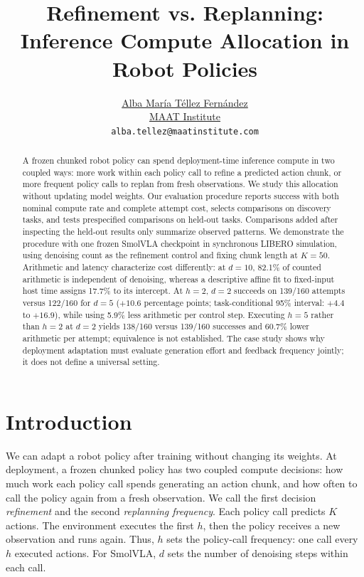 \documentclass{article}
\title{Refinement vs. Replanning: Inference Compute Allocation in Robot Policies}
\author{\href{https://amtellezfernandez.com/}{Alba Mar\'ia T\'ellez Fern\'andez}\\
\href{https://maatinstitute.com/}{MAAT Institute}\\
\texttt{alba.tellez@maatinstitute.com}}
\begin{document}
\maketitle

\begin{abstract}
A frozen chunked robot policy can spend deployment-time inference compute in two coupled ways:
more work within each policy call to refine a predicted action chunk, or more
frequent policy calls to replan from fresh observations. We study this allocation
without updating model weights. Our evaluation procedure reports success with
both nominal compute rate and complete attempt cost, selects comparisons on
discovery tasks, and tests prespecified comparisons on held-out tasks. Comparisons
added after inspecting the held-out results only summarize observed patterns. We
demonstrate the procedure
with one frozen SmolVLA checkpoint in synchronous LIBERO simulation, using
denoising count as the refinement control and fixing chunk length at $K=50$.
Arithmetic and latency characterize cost differently: at $d=10$, 82.1\% of
counted arithmetic is independent of denoising, whereas a descriptive affine
fit to fixed-input host time assigns 17.7\% to its intercept. At $h=2$, $d=2$
succeeds on 139/160 attempts versus 122/160 for $d=5$ ($+10.6$ percentage
points; task-conditional 95\% interval: $+4.4$ to $+16.9$), while using 5.9\%
less arithmetic per control step. Executing $h=5$ rather than $h=2$ at $d=2$
yields 138/160 versus 139/160 successes and 60.7\% lower arithmetic per attempt;
equivalence is not established. The case study shows why deployment adaptation
must evaluate generation effort and feedback frequency jointly; it does not
define a universal setting.
\end{abstract}

\section{Introduction}

We can adapt a robot policy after training without changing its weights. At
deployment, a frozen chunked policy has two coupled compute decisions: how much
work each policy call spends generating an action chunk, and how often to call
the policy again from a fresh observation. We call the first decision
\emph{refinement} and the second \emph{replanning frequency}. Each policy call
predicts $K$ actions. The environment executes the first $h$, then the policy
receives a new observation and runs again. Thus, $h$ sets the policy-call
frequency: one call every $h$ executed actions. For SmolVLA, $d$ sets the number
of denoising steps within each call.
\end{document}
